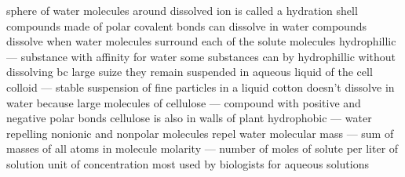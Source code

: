 \documentclass[../main.tex]{subfiles}
\begin{document}
\begin{outline}
	\1 sphere of water molecules around dissolved ion is called a hydration shell
	\1 compounds made of polar covalent bonds can dissolve in water
	\2 compounds dissolve when water molecules surround each of the solute molecules
	\1 hydrophillic --- substance with affinity for water
	\2 some substances can by hydrophillic without dissolving bc large suize
	\3 they remain suspended in aqueous liquid of the cell
	\1 colloid --- stable suspension of fine particles in a liquid
	\1 cotton doesn't dissolve in water because large molecules of cellulose --- compound with positive and negative polar bonds
	\2 cellulose is also in walls of plant
	\1 hydrophobic --- water repelling
	\2 nonionic and nonpolar molecules repel water
	\1 molecular mass --- sum of masses of all atoms in molecule
	\1 molarity --- number of moles of solute per liter of solution
	\2 unit of concentration most used by biologists for aqueous solutions

\end{outline}
\end{document}
